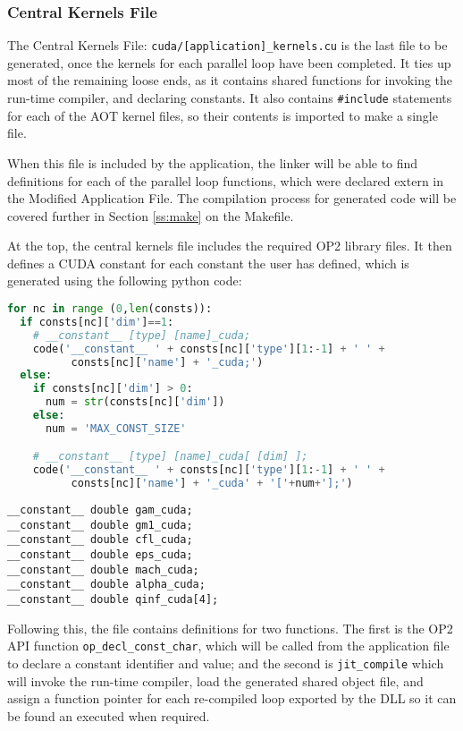 \subsubsection{Central Kernels File}
\label{sss:mkf}
The Central Kernels File: \verb|cuda/[application]_kernels.cu| is the last file to be generated, once the kernels for each parallel loop have been completed. It ties up most of the remaining loose ends, as it contains shared functions for invoking the run-time compiler, and declaring constants. It also contains \verb|#include| statements for each of the AOT kernel files, so their contents is imported to make a single file.
\par
When this file is included by the application, the linker will be able to find definitions for each of the parallel loop functions, which were declared extern in the Modified Application File. The compilation process for generated code will be covered further in Section \ref{ss:make} on the Makefile.
\par
At the top, the central kernels file includes the required OP2 library files. It then defines a CUDA constant for each constant the user has defined, which is generated using the following python code:\\
\begin{lstlisting}[backgroundcolor = \color{lightgray!20}, language=Python]
for nc in range (0,len(consts)):
  if consts[nc]['dim']==1:
    # __constant__ [type] [name]_cuda;
    code('__constant__ ' + consts[nc]['type'][1:-1] + ' ' +
          consts[nc]['name'] + '_cuda;')
  else:
    if consts[nc]['dim'] > 0:
      num = str(consts[nc]['dim'])
    else:
      num = 'MAX_CONST_SIZE'

    # __constant__ [type] [name]_cuda[ [dim] ];
    code('__constant__ ' + consts[nc]['type'][1:-1] + ' ' +
          consts[nc]['name'] + '_cuda' + '['+num+'];')
\end{lstlisting}
\clearpage

\begin{lstlisting}
__constant__ double gam_cuda;
__constant__ double gm1_cuda;
__constant__ double cfl_cuda;
__constant__ double eps_cuda;
__constant__ double mach_cuda;
__constant__ double alpha_cuda;
__constant__ double qinf_cuda[4];
\end{lstlisting}
\vspace{-1cm}

Following this, the file contains definitions for two functions. The first is the OP2 API function \verb|op_decl_const_char|, which will be called from the application file to declare a constant identifier and value; and the second is \verb|jit_compile| which will invoke the run-time compiler, load the generated shared object file, and assign a function pointer for each re-compiled loop exported by the DLL so it can be found an executed when required.

